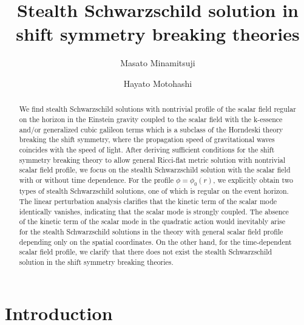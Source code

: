 \documentclass[prd,amsmath,amssymb,floatfix,superscriptaddress,notitlepage,nofootinbib,preprintnumbers]{revtex4-1}
\begin{document}

\title{
Stealth Schwarzschild solution in shift symmetry breaking theories
}

\author{Masato Minamitsuji}

\author{Hayato Motohashi}


\begin{abstract}%
We find stealth Schwarzschild solutions with nontrivial profile of the scalar field regular on the horizon in the Einstein gravity coupled to the scalar field with the k-essence and/or generalized cubic galileon terms which is a subclass of the Horndeski theory breaking the shift symmetry, where the propagation speed of gravitational waves coincides with the speed of light.  After deriving sufficient conditions for the shift symmetry breaking theory to allow general Ricci-flat metric solution with nontrivial scalar field profile, we focus on the stealth Schwarzschild solution with the scalar field with or without time dependence. For the profile $\phi=\phi_0(r)$, we explicitly obtain two types of stealth Schwarzschild solutions, one of which is regular on the event horizon. The linear perturbation analysis clarifies that the kinetic term of the scalar mode identically vanishes, indicating that the scalar mode is strongly coupled. The absence of the kinetic term of the scalar mode in the quadratic action would inevitably arise for the stealth Schwarzschild solutions in the theory with general scalar field profile depending only on the spatial coordinates. On the other hand, for the time-dependent scalar field profile, we clarify that there does not exist the stealth Schwarzschild solution in the shift symmetry breaking theories.
\end{abstract}

\maketitle  


\section{Introduction}
\label{sec1}
\end{document}
